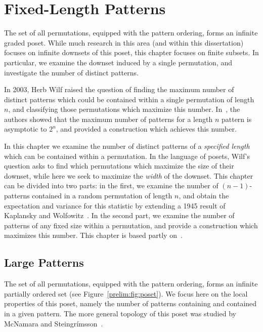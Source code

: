 \chapter{Fixed-Length Patterns}
\label{chap:fixpat}


  The set of all permutations, equipped with the pattern ordering, forms an
  infinite graded poset. While much research in this area (and within this
  dissertation) focuses on infinite downsets of this poset, this chapter focuses
  on finite subsets. In particular, we examine the downset induced by a single
  permutation, and investigate the number of distinct patterns. 
  

  In 2003, Herb Wilf raised the question of finding the maximum number of
  distinct patterns which could be contained within a single permutation of
  length $n$, and classifying those permutations which maximize this number. 
  In~\cite{Flynn2007}, the authors showed that the maximum number of patterns
  for a length $n$ pattern is asymptotic to $2^n$, and provided a construction
  which achieves this number. 

  In this chapter we examine the number of distinct patterns of a
  \emph{specified length} which can be contained within a permutation. 
  In the language of posets, Wilf's question asks to find which permutations
  which maximize the size of their downset, while here we seek to maximize the
  \emph{width} of the downset. This chapter can be divided into two parts: in
  the first, we examine the number of $(n-1)$-patterns contained in a random
  permutation of length $n$, and obtain the expectation and variance for this statistic
  by extending a 1945 result of Kaplansky and Wolfowitz~\cite{Kaplansky,
  Wolfowitz}. In the second part, we examine the number of patterns of any
  fixed size within a permutation, and provide a construction which maximizes
  this number. This chapter is based partly on~\cite{me-fixpat}.


\section{Large Patterns}


  The set of all permutations, equipped with the pattern ordering, forms an
  infinite partially ordered set (see Figure~\ref{prelim:fig:poset}). We focus
  here on the local properties of this poset, namely the number of patterns
  containing and contained in a given pattern. The more general topology of
  this poset was studied by McNamara and
  Steingr\'imsson~\cite{Steingrimsson2013}.

